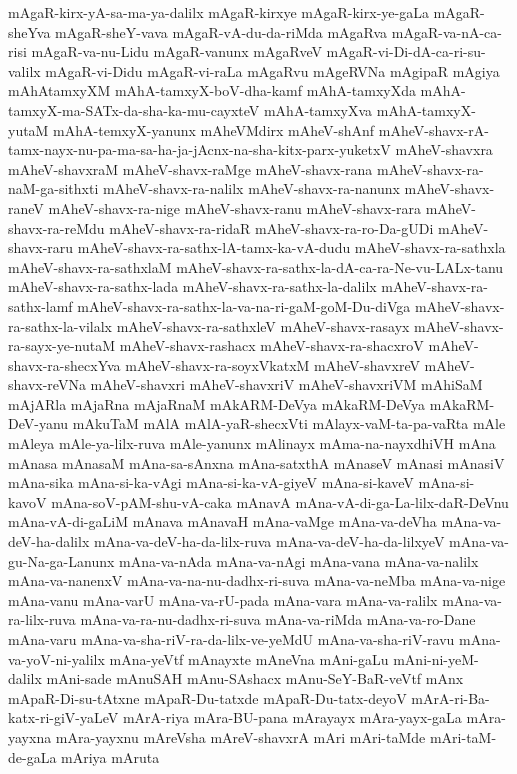 {mAgaR-kirx-yA-sa-ma-ya-dalilx
mAgaR-kirxye
mAgaR-kirx-ye-gaLa
mAgaR-sheYva
mAgaR-sheY-vava
mAgaR-vA-du-da-riMda
mAgaRva
mAgaR-va-nA-ca-risi
mAgaR-va-nu-Lidu
mAgaR-vanunx
mAgaRveV
mAgaR-vi-Di-dA-ca-ri-su-valilx
mAgaR-vi-Didu
mAgaR-vi-raLa
mAgaRvu
mAgeRVNa
mAgipaR
mAgiya
mAhAtamxyXM
mAhA-tamxyX-boV-dha-kamf
mAhA-tamxyXda
mAhA-tamxyX-ma-SATx-da-sha-ka-mu-cayxteV
mAhA-tamxyXva
mAhA-tamxyX-yutaM
mAhA-temxyX-yanunx
mAheVMdirx
mAheV-shAnf
mAheV-shavx-rA-tamx-nayx-nu-pa-ma-sa-ha-ja-jAcnx-na-sha-kitx-parx-yuketxV
mAheV-shavxra
mAheV-shavxraM
mAheV-shavx-raMge
mAheV-shavx-rana
mAheV-shavx-ra-naM-ga-sithxti
mAheV-shavx-ra-nalilx
mAheV-shavx-ra-nanunx
mAheV-shavx-raneV
mAheV-shavx-ra-nige
mAheV-shavx-ranu
mAheV-shavx-rara
mAheV-shavx-ra-reMdu
mAheV-shavx-ra-ridaR
mAheV-shavx-ra-ro-Da-gUDi
mAheV-shavx-raru
mAheV-shavx-ra-sathx-lA-tamx-ka-vA-dudu
mAheV-shavx-ra-sathxla
mAheV-shavx-ra-sathxlaM
mAheV-shavx-ra-sathx-la-dA-ca-ra-Ne-vu-LALx-tanu
mAheV-shavx-ra-sathx-lada
mAheV-shavx-ra-sathx-la-dalilx
mAheV-shavx-ra-sathx-lamf
mAheV-shavx-ra-sathx-la-va-na-ri-gaM-goM-Du-diVga
mAheV-shavx-ra-sathx-la-vilalx
mAheV-shavx-ra-sathxleV
mAheV-shavx-rasayx
mAheV-shavx-ra-sayx-ye-nutaM
mAheV-shavx-rashacx
mAheV-shavx-ra-shacxroV
mAheV-shavx-ra-shecxYva
mAheV-shavx-ra-soyxVkatxM
mAheV-shavxreV
mAheV-shavx-reVNa
mAheV-shavxri
mAheV-shavxriV
mAheV-shavxriVM
mAhiSaM
mAjARla
mAjaRna
mAjaRnaM
mAkARM-DeVya
mAkaRM-DeVya
mAkaRM-DeV-yanu
mAkuTaM
mAlA
mAlA-yaR-shecxVti
mAlayx-vaM-ta-pa-vaRta
mAle
mAleya
mAle-ya-lilx-ruva
mAle-yanunx
mAlinayx
mAma-na-nayxdhiVH
mAna
mAnasa
mAnasaM
mAna-sa-sAnxna
mAna-satxthA
mAnaseV
mAnasi
mAnasiV
mAna-sika
mAna-si-ka-vAgi
mAna-si-ka-vA-giyeV
mAna-si-kaveV
mAna-si-kavoV
mAna-soV-pAM-shu-vA-caka
mAnavA
mAna-vA-di-ga-La-lilx-daR-DeVnu
mAna-vA-di-gaLiM
mAnava
mAnavaH
mAna-vaMge
mAna-va-deVha
mAna-va-deV-ha-dalilx
mAna-va-deV-ha-da-lilx-ruva
mAna-va-deV-ha-da-lilxyeV
mAna-va-gu-Na-ga-Lanunx
mAna-va-nAda
mAna-va-nAgi
mAna-vana
mAna-va-nalilx
mAna-va-nanenxV
mAna-va-na-nu-dadhx-ri-suva
mAna-va-neMba
mAna-va-nige
mAna-vanu
mAna-varU
mAna-va-rU-pada
mAna-vara
mAna-va-ralilx
mAna-va-ra-lilx-ruva
mAna-va-ra-nu-dadhx-ri-suva
mAna-va-riMda
mAna-va-ro-Dane
mAna-varu
mAna-va-sha-riV-ra-da-lilx-ve-yeMdU
mAna-va-sha-riV-ravu
mAna-va-yoV-ni-yalilx
mAna-yeVtf
mAnayxte
mAneVna
mAni-gaLu
mAni-ni-yeM-dalilx
mAni-sade
mAnuSAH
mAnu-SAshacx
mAnu-SeY-BaR-veVtf
mAnx
mApaR-Di-su-tAtxne
mApaR-Du-tatxde
mApaR-Du-tatx-deyoV
mArA-ri-Ba-katx-ri-giV-yaLeV
mArA-riya
mAra-BU-pana
mArayayx
mAra-yayx-gaLa
mAra-yayxna
mAra-yayxnu
mAreVsha
mAreV-shavxrA
mAri
mAri-taMde
mAri-taM-de-gaLa
mAriya
mAruta
}
